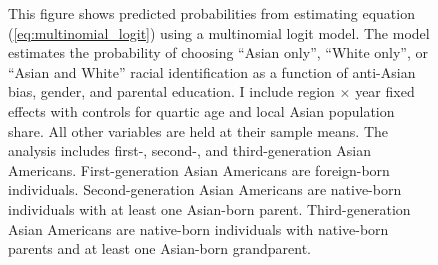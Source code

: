 \begin{center}
\begin{figure}[!htb]
\caption*{\footnotesize{This figure shows predicted probabilities from estimating equation (\ref{eq:multinomial_logit}) using a multinomial logit model. The model estimates the probability of choosing ``Asian only'', ``White only'', or ``Asian and White'' racial identification as a function of anti-Asian bias, gender, and parental education. I include region $\times$ year fixed effects with controls for quartic age and local Asian population share. All other variables are held at their sample means. The analysis includes first-, second-, and third-generation Asian Americans. First-generation Asian Americans are foreign-born individuals. Second-generation Asian Americans are native-born individuals with at least one Asian-born parent. Third-generation Asian Americans are native-born individuals with native-born parents and at least one Asian-born grandparent.}}
\end{figure}
\end{center}



\pagebreak
\newpage



